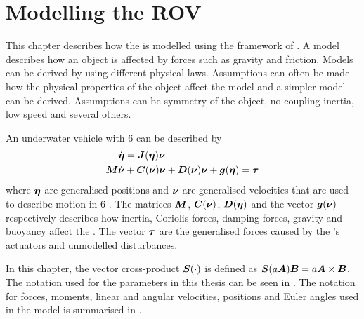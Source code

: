 \chapter{Modelling the ROV} \label{cha:modelling}
This chapter describes how the \abbrROV is modelled using the framework of \citet{fossen2011}. A model describes how an object is affected by forces such as gravity and friction. Models can be derived by using different physical laws. Assumptions can often be made how the physical properties of the object affect the model and a simpler model can be derived. Assumptions can be symmetry of the object, no coupling inertia, low speed and several others. 

An underwater vehicle with 6 \abbrDOF can be described by
\begin{align}
\dot{\boldsymbol{\eta}}& = \boldsymbol{J}(\boldsymbol{\eta})\boldsymbol{\nu} \\\label{eq:model}
 \boldsymbol{M} \dot{\boldsymbol{\nu}} &+ \boldsymbol{C}(\boldsymbol{\nu})\boldsymbol{\nu} + \boldsymbol{D}(\boldsymbol{\nu})\boldsymbol{\nu} + \boldsymbol{g}(\boldsymbol{\eta}) = \boldsymbol{\tau} 
\end{align}
where $\boldsymbol{\eta}$ are generalised positions and $\boldsymbol{\nu}$ are generalised velocities that are used to describe motion in 6 \abbrDOF \citep[p. 15]{fossen2011}. The matrices $\boldsymbol{M}$, $\boldsymbol{C}(\boldsymbol{\nu})$, $\boldsymbol{D}(\boldsymbol{\eta})$ and the vector $\boldsymbol{g}(\boldsymbol{\nu})$ respectively describes how inertia, Coriolis forces, damping forces, gravity and buoyancy affect the \abbrROV. The vector $\boldsymbol{\tau}$ are the generalised forces caused by the \abbrROV's actuators and unmodelled disturbances.
 
In this chapter, the vector cross-product $\boldsymbol{S}(\cdot)$ is defined as $\boldsymbol{S}(a\boldsymbol{A}) \boldsymbol{B} = a\boldsymbol{A} \times \boldsymbol{B}$. The notation used for the parameters in this thesis can be seen in . The notation for forces, moments, linear and angular velocities, positions and Euler angles used in the model is summarised in . 

